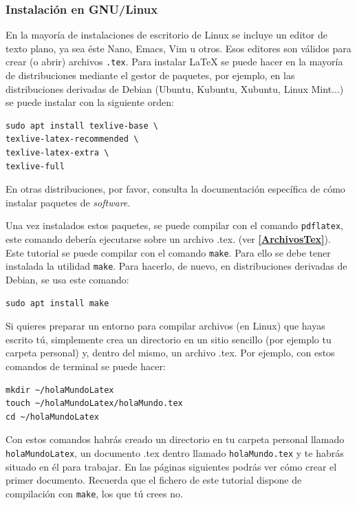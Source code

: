 \documentclass[a4paper]{article}
\begin{document}
\subsubsection{Instalación en GNU/Linux}\label{instGNULinux}
En la mayoría de instalaciones de escritorio de Linux se incluye un editor de
texto plano, ya sea éste Nano, Emacs, Vim u otros. Esos editores son válidos
para crear (o abrir) archivos \texttt{.tex}. Para instalar \LaTeX{} se puede
hacer en la mayoría de distribuciones mediante el gestor de paquetes, por
ejemplo, en las distribuciones derivadas de Debian (Ubuntu, Kubuntu, Xubuntu,
Linux Mint...) se puede instalar con la siguiente orden:
\begin{verbatim}
sudo apt install texlive-base \
texlive-latex-recommended \
texlive-latex-extra \
texlive-full
\end{verbatim} 
En otras distribuciones, 
por favor, consulta la documentación específica de cómo instalar paquetes de
\textit{software}.

Una vez instalados estos paquetes, se puede compilar con el comando
\texttt{pdflatex}, este comando debería ejecutarse sobre un archivo .tex.
(ver \textbf{\ref{ArchivosTex}}). Este tutorial se puede compilar
con el comando \texttt{make}. Para ello se debe tener instalada la utilidad 
\texttt{make}. Para hacerlo, de nuevo, en distribuciones derivadas de
Debian, se usa este comando:
\begin{verbatim}
sudo apt install make
\end{verbatim}

Si quieres preparar un entorno para compilar archivos (en Linux) que hayas
escrito tú, simplemente crea un directorio en un sitio sencillo (por ejemplo tu
carpeta personal) y, dentro del mismo, un archivo .tex. Por ejemplo, con estos
comandos de terminal se puede hacer:
\begin{verbatim}
mkdir ~/holaMundoLatex
touch ~/holaMundoLatex/holaMundo.tex
cd ~/holaMundoLatex
\end{verbatim}

Con estos comandos habrás creado un directorio en tu carpeta personal llamado
\texttt{holaMundoLatex}, un documento .tex dentro llamado \texttt{holaMundo.tex}
y te habrás situado en él para trabajar. En las páginas siguientes podrás ver
cómo crear el primer documento. Recuerda que el fichero de este tutorial dispone
de compilación con \texttt{make}, los que tú crees no.
\end{document}
